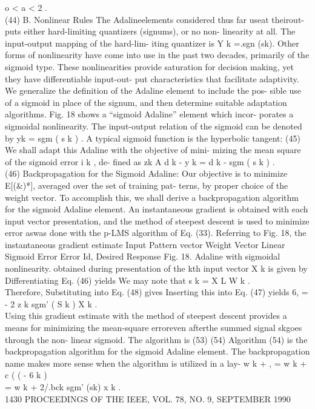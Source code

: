 o \textless{} a \textless{} 2 .\\
(44) B. Nonlinear Rules The Adalineelements considered thus far useat
theirout- puts either hard-limiting quantizers (signums), or no non-
linearity at all. The input-output mapping of the hard-lim- iting
quantizer is Y k =.sgn (sk). Other forms of nonlinearity have come into
use in the past two decades, primarily of the sigmoid type. These
nonlinearities provide saturation for decision making, yet they have
differentiable input-out- put characteristics that facilitate
adaptivity. We generalize the definition of the Adaline element to
include the pos- sible use of a sigmoid in place of the signum, and then
determine suitable adaptation algorithms. Fig. 18 shows a ``sigmoid
Adaline'' element which incor- porates a sigmoidal nonlinearity. The
input-output relation of the sigmoid can be denoted by yk = sgm ( s k )
. A typical sigmoid function is the hyperbolic tangent: (45) We shall
adapt this Adaline with the objective of mini- mizing the mean square of
the sigmoid error i k , de- fined as zk A d k - y k = d k - sgm ( s k )
.\\
(46) Backpropagation for the Sigmoid Adaline: Our objective is to
minimize E{[}(\&)*{]}, averaged over the set of training pat- terns, by
proper choice of the weight vector. To accomplish this, we shall derive
a backpropagation algorithm for the sigmoid Adaline element. An
instantaneous gradient is obtained with each input vector presentation,
and the method of steepest descent is used to minimize error aswas done
with the p-LMS algorithm of Eq. (33). Referring to Fig. 18, the
instantaneous gradient estimate Input Pattern vector Weight Vector
Linear Sigmoid Error Error Id, Desired Response Fig. 18. Adaline with
sigmoidal nonlinearity. obtained during presentation of the kth input
vector X k is given by Differentiating Eq. (46) yields We may note that
s k = X L W k .\\
Therefore, Substituting into Eq. (48) gives Inserting this into Eq. (47)
yields 6, = - 2 z k sgm' ( S k ) X k .\\
Using this gradient estimate with the method of steepest descent
provides a means for minimizing the mean-square erroreven afterthe
summed signal skgoes through the non- linear sigmoid. The algorithm is
(53) (54) Algorithm (54) is the backpropagation algorithm for the
sigmoid Adaline element. The backpropagation name makes more sense when
the algorithm is utilized in a lay- w k + , = w k + c ( ( - 6 k )\\
= w k + 2/.bck sgm' (sk) x k .\\
1430 PROCEEDINGS OF THE IEEE, VOL. 78, NO. 9, SEPTEMBER 1990

